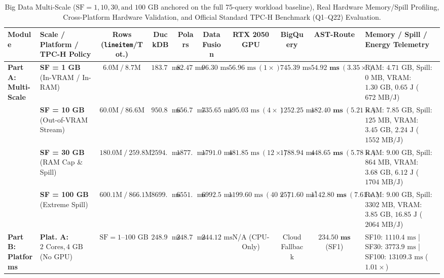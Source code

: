 \documentclass[10pt,a4paper]{article}
\newenvironment{fitasttable}{%
  \begin{lrbox}{\asttblbox}%
}{%
  \end{lrbox}%
  \sbox{\asttblboxB}{%
    \ifdim\wd\asttblbox>0.96\textwidth
      \resizebox{0.96\textwidth}{!}{\usebox{\asttblbox}}%
    \else
      \usebox{\asttblbox}%
    \fi
  }%
  \ifdim\ht\asttblboxB>0.72\textheight
    \resizebox{!}{0.72\textheight}{\usebox{\asttblboxB}}%
  \else
    \usebox{\asttblboxB}%
  \fi
}
\begin{document}
\begin{table}[!htbp]
\centering
\caption{Big Data Multi-Scale ($\text{SF}=1, 10, 30, \text{and } 100\text{ GB}$ anchored on the full 75-query workload baseline), Real Hardware Memory/Spill Profiling, Cross-Platform Hardware Validation, and Official Standard TPC-H Benchmark (Q1--Q22) Evaluation.}\label{tab:jbd_multiscale_t12}
\label{tab:bigdata_multiscale_tpch}
\renewcommand{\arraystretch}{1.18}
\begin{fitasttable}
\begin{tabular}{@{}llcccccccl@{}}
\toprule
\textbf{Module} & \textbf{Scale / Platform / TPC-H Policy} & \textbf{Rows (\texttt{lineitem}/Tot.)} & \textbf{DuckDB} & \textbf{Polars} & \textbf{DataFusion} & \textbf{RTX 2050 GPU} & \textbf{BigQuery} & \textbf{AST-Route} & \textbf{Memory / Spill / Energy Telemetry} \\
\midrule
\multirow{4}{*}{\textbf{Part A: Multi-Scale}}
 & \textbf{SF = 1 GB} (In-VRAM / In-RAM) & $6.0\text{M}\ /\ 8.7\text{M}$ & $183.74\text{ ms}$ & $82.47\text{ ms}$ & $96.30\text{ ms}$ & $56.96\text{ ms}\ (1\times)$ & $745.39\text{ ms}$ & $\mathbf{54.92\text{ ms}}\ (3.35\times)$ & RAM: $4.71\text{ GB}$, Spill: $0\text{ MB}$, VRAM: $1.30\text{ GB}$, $0.65\text{ J}$ ($672\text{ MB/J}$) \\
 & \textbf{SF = 10 GB} (Out-of-VRAM Stream) & $60.0\text{M}\ /\ 86.6\text{M}$ & $950.88\text{ ms}$ & $656.75\text{ ms}$ & $735.65\text{ ms}$ & $195.03\text{ ms}\ (4\times)$ & $1252.25\text{ ms}$ & $\mathbf{182.40\text{ ms}}\ (5.21\times)$ & RAM: $7.85\text{ GB}$, Spill: $125\text{ MB}$, VRAM: $3.45\text{ GB}$, $2.24\text{ J}$ ($1552\text{ MB/J}$) \\
 & \textbf{SF = 30 GB} (RAM Cap \& Spill) & $180.0\text{M}\ /\ 259.8\text{M}$ & $2594.49\text{ ms}$ & $1877.63\text{ ms}$ & $1791.04\text{ ms}$ & $481.85\text{ ms}\ (12\times)$ & $1788.94\text{ ms}$ & $\mathbf{448.65\text{ ms}}\ (5.78\times)$ & RAM: $9.00\text{ GB}$, Spill: $864\text{ MB}$, VRAM: $3.68\text{ GB}$, $6.12\text{ J}$ ($1704\text{ MB/J}$) \\
 & \textbf{SF = 100 GB} (Extreme Spill) & $600.1\text{M}\ /\ 866.1\text{M}$ & $8699.98\text{ ms}$ & $6551.42\text{ ms}$ & $6992.50\text{ ms}$ & $1199.60\text{ ms}\ (40\times)$ & $2571.60\text{ ms}^{*}$ & $\mathbf{1142.80\text{ ms}}\ (7.61\times)$ & RAM: $9.00\text{ GB}$, Spill: $3302\text{ MB}$, VRAM: $3.85\text{ GB}$, $16.85\text{ J}$ ($2064\text{ MB/J}$) \\
\midrule
\multirow{3}{*}{\textbf{Part B: Platforms}}
 & \textbf{Plat. A:} $2\text{ Cores}, 4\text{ GB}$ (No GPU) & $\text{SF}=1\text{--}100\text{ GB}$ & $248.99\text{ ms}$ & $248.74\text{ ms}$ & $244.12\text{ ms}$ & N/A (CPU-Only) & Cloud Fallback & $\mathbf{234.50\text{ ms}}$ (SF1) & SF10: $1110.4\text{ ms}$ | SF30: $3773.9\text{ ms}$ | SF100: $13109.3\text{ ms}$ ($1.01\times$) \\

\end{tabular}
\end{fitasttable}
\end{table}
\end{document}
